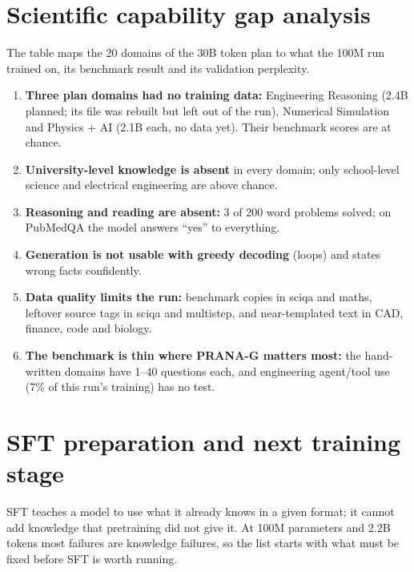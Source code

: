 \documentclass[11pt,a4paper]{article}
\begin{document}
\section{Scientific capability gap analysis}
The table maps the 20 domains of the 30B token plan to what the 100M run trained on, its benchmark result and its validation perplexity.

\begin{table}[H]\centering\scriptsize

\caption{Capability gaps. ``Plan'' is the 30B allocation; ``100M run'' is the approximate number of tokens of that domain the model saw.}
\end{table}

\begin{enumerate}
\item \textbf{Three plan domains had no training data:} Engineering Reasoning (2.4B planned; its file was rebuilt but left out of the run), Numerical
  Simulation and Physics + AI (2.1B each, no data yet). Their benchmark scores are at chance.
\item \textbf{University-level knowledge is absent} in every domain; only school-level science and electrical engineering are above chance.
\item \textbf{Reasoning and reading are absent:} 3 of 200 word problems solved; on PubMedQA the model answers ``yes'' to everything.
\item \textbf{Generation is not usable with greedy decoding} (loops) and states wrong facts confidently.
\item \textbf{Data quality limits the run:} benchmark copies in sciqa and maths, leftover source tags in sciqa and multistep, and near-templated
  text in CAD, finance, code and biology.
\item \textbf{The benchmark is thin where PRANA-G matters most:} the hand-written domains have 1--40 questions each, and engineering agent/tool use
  (7\% of this run's training) has no test.
\end{enumerate}

\section{SFT preparation and next training stage}
SFT teaches a model to use what it already knows in a given format; it cannot add knowledge that pretraining did not give it. At 100M parameters and
2.2B tokens most failures are knowledge failures, so the list starts with what must be fixed before SFT is worth running.
\end{document}
